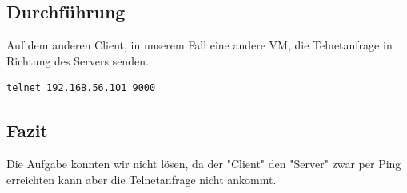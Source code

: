 \subsection{Durchführung}
Auf dem anderen Client, in unserem Fall eine andere VM, die Telnetanfrage in Richtung des Servers senden.

\begin{lstlisting}
telnet 192.168.56.101 9000
\end{lstlisting}

\subsection{Fazit}
Die Aufgabe konnten wir nicht lösen, da der "Client" den "Server" zwar per Ping erreichten kann aber die Telnetanfrage nicht ankommt.